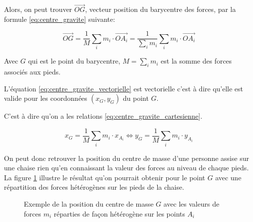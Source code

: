 \documentclass{polytech/polytech}
\begin{document}
Alors, on peut trouver $\vec{OG}$, vecteur position du barycentre des forces, par la formule \eqref{eq:centre_gravite}  suivante:

\begin{equation}
\label{eq:centre_gravite_vectorielle}
\vec{OG} = \frac{1}{M} \sum_i m_i  \cdot \vec{OA_i} =   \frac{1}{\sum_i m_i} \sum_i m_i  \cdot \vec{OA_i} 
\end{equation}

Avec $G$ qui est le point du barycentre, $M=\sum_i m_i$ est la somme des forces associés aux pieds.

L'équation \eqref{eq:centre_gravite_vectorielle} est vectorielle c'est à dire qu'elle est valide pour les coordonnées $(x_G,y_G)$ du point $G$.

C'est à dire qu'on a les relations \eqref{eq:centre_gravite_cartesienne}.

\begin{equation}
\label{eq:centre_gravite_cartesienne}
x_G = \frac{1}{M} \sum_i m_i  \cdot x_{A_i} \Leftrightarrow  y_G = \frac{1}{M} \sum_i m_i  \cdot y_{A_i}
\end{equation}

On peut donc retrouver la position du centre de masse d'une personne assise sur une chaise rien qu'en connaissant la valeur des forces au niveau de chaque pieds. La figure \ref{fig:schem_plan_sol_math_G} illustre le résultat qu'on pourrait obtenir pour le point $G$ avec une répartition des forces hétérogènes sur les pieds de la chaise.

\begin{figure}[htbp]
\begin{center}
\end{center}
\caption{Exemple de la position du centre de masse $G$ avec les valeurs de forces $m_i$ réparties de façon hétérogène sur les points $A_i$ }
\label{fig:schem_plan_sol_math_G}
\end{figure}
\end{document}
